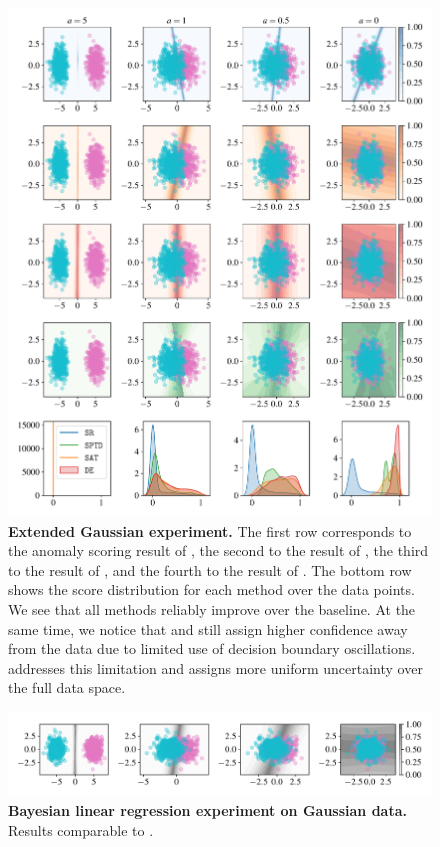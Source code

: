 \begin{figure}[t]
  \centering
  \includegraphics[width=0.95\linewidth]{figs/sptd/gaussians_2.pdf}
\caption[Extended Gaussian experiment.]{\textbf{Extended Gaussian experiment.}  The first row corresponds to the anomaly scoring result of \sr, the second to the result of \sat, the third to the result of \de, and the fourth to the result of \sptd. The bottom row shows the score distribution for each method over the data points. We see that all methods reliably improve over the \sr baseline. At the same time, we notice that \sat and \de still assign higher confidence away from the data due to limited use of decision boundary oscillations. \sptd addresses this limitation and assigns more uniform uncertainty over the full data space.}
\label{fig:gauss_ext}
\end{figure}

\begin{figure}[t]
  \centering
  \includegraphics[width=\linewidth]{figs/sptd/blr.pdf}
\caption[Bayesian linear regression experiment on Gaussian data.]{\textbf{Bayesian linear regression experiment on Gaussian data.} Results comparable to \de.}
\label{fig:blr}
\end{figure}

